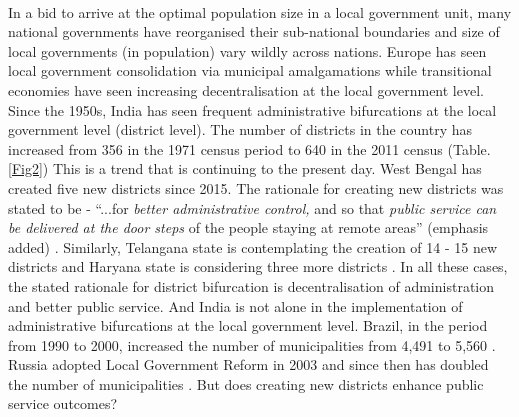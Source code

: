 \documentclass[12pt, a4paper]{article}
\begin{document}
\paragraph{} In a bid to arrive at the optimal population size in a local government unit, many national governments have reorganised their sub-national boundaries and size of local governments (in population) vary wildly across nations. Europe has seen local government consolidation via municipal amalgamations while transitional economies have seen increasing decentralisation at the local government level. Since the 1950s, India has seen frequent administrative bifurcations at the local government level (district level). The number of districts in the country has increased from 356 in the 1971 census period to 640 in the 2011 census (Table. \ref{Fig2}) This is a trend that is continuing to the present day. West Bengal has created five new districts since 2015. The rationale for creating new districts was stated to be - ``...for \textit{better administrative control,} and so that \textit{public service can be delivered at the door steps} of the people staying at remote areas'' (emphasis added) \parencite{Mamata}. Similarly, Telangana state is contemplating the creation of 14 - 15 new districts \parencite{Telengana} and Haryana state is considering three more districts \parencite{Haryana}. In all these cases, the stated rationale for district bifurcation is decentralisation of administration and better public service. And India is not alone in the implementation of administrative bifurcations at the local government level. Brazil, in the period from 1990 to 2000, increased the number of municipalities from 4,491 to 5,560 \parencite{tomio2005creation}. Russia adopted Local Government Reform in 2003 and since then has doubled the number of municipalities \parencite{turgel2008new}\nocite{avellaneda_is_2015}. But does creating new districts enhance public service outcomes?
	
\end{document}
